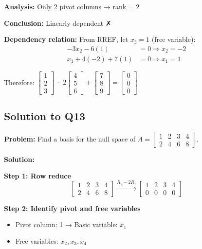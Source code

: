 \documentclass[12pt,a4paper]{article}
\theoremstyle{definition}
\begin{document}
\textbf{Analysis:} Only 2 pivot columns → rank = 2

\textbf{Conclusion:} Linearly dependent ✗

\textbf{Dependency relation:} From RREF, let $x_3 = 1$ (free variable):
\begin{align}
-3x_2 - 6(1) &= 0 \Rightarrow x_2 = -2 \\
x_1 + 4(-2) + 7(1) &= 0 \Rightarrow x_1 = 1
\end{align}

Therefore: $\begin{bmatrix} 1 \\ 2 \\ 3 \end{bmatrix} - 2\begin{bmatrix} 4 \\ 5 \\ 6 \end{bmatrix} + \begin{bmatrix} 7 \\ 8 \\ 9 \end{bmatrix} = \begin{bmatrix} 0 \\ 0 \\ 0 \end{bmatrix}$

\subsection{Solution to Q13}

\textbf{Problem:} Find a basis for the null space of $A = \begin{bmatrix} 1 & 2 & 3 & 4 \\ 2 & 4 & 6 & 8 \end{bmatrix}$.

\textbf{Solution:}

\textbf{Step 1: Row reduce}
\begin{equation}
\begin{bmatrix} 1 & 2 & 3 & 4 \\ 2 & 4 & 6 & 8 \end{bmatrix} \xrightarrow{R_2 - 2R_1} \begin{bmatrix} 1 & 2 & 3 & 4 \\ 0 & 0 & 0 & 0 \end{bmatrix}
\end{equation}

\textbf{Step 2: Identify pivot and free variables}
\begin{itemize}
    \item Pivot column: 1 → Basic variable: $x_1$
    \item Free variables: $x_2, x_3, x_4$
\end{itemize}
\end{document}

